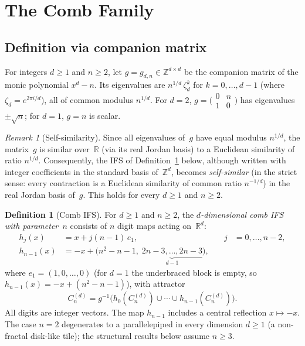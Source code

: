 \documentclass{amsart}
\theoremstyle{definition}
\newtheorem{definition}[theorem]{Definition}
\theoremstyle{remark}
\newtheorem{remark}[theorem]{Remark}
\newcommand{\R}{\mathbb{R}}
\newcommand{\Z}{\mathbb{Z}}
\begin{document}
\section{The Comb Family}
\label{sec:comb}

\subsection{Definition via companion matrix}

For integers $d \ge 1$ and $n \ge 2$, let
$g = g_{d,n} \in \Z^{d \times d}$
be the companion matrix of the monic polynomial $x^d - n$.
Its eigenvalues are
$n^{1/d}\,\zeta_d^k$ for $k = 0, \ldots, d{-}1$
(where $\zeta_d = e^{2\pi i/d}$), all of common modulus $n^{1/d}$.
For $d = 2$, $g = \bigl(\begin{smallmatrix}0 & n \\ 1 & 0\end{smallmatrix}\bigr)$
has eigenvalues $\pm\sqrt n$; for $d = 1$, $g = n$ is scalar.

\begin{remark}[Self-similarity]
\label{rem:jordan-similarity}
Since all eigenvalues of~$g$ have equal modulus $n^{1/d}$, the
matrix~$g$ is similar over~$\R$ (via its real Jordan basis) to a
Euclidean similarity of ratio $n^{1/d}$.
Consequently, the IFS of Definition~\ref{def:comb-d} below, although
written with integer coefficients in the standard basis of~$\Z^d$,
becomes \emph{self-similar} (in the strict sense: every contraction
is a Euclidean similarity of common ratio $n^{-1/d}$) in the real
Jordan basis of~$g$.
This holds for every $d \ge 1$ and $n \ge 2$.
\end{remark}

\begin{definition}[Comb IFS]\label{def:comb-d}\label{def:comb}
For $d \ge 1$ and $n \ge 2$, the \emph{$d$-dimensional comb IFS with
parameter~$n$} consists of $n$ digit maps acting on~$\R^d$:
\begin{equation}\label{eq:comb-maps}
\begin{aligned}
  h_j(x) &= x + j(n{-}1)\,e_1,
    &\quad j &= 0, \ldots, n{-}2, \\[2pt]
  h_{n-1}(x) &= -x + \bigl(n^2{-}n{-}1,\;
    \underbrace{2n{-}3, \ldots, 2n{-}3}_{d-1}\bigr),
\end{aligned}
\end{equation}
where $e_1 = (1, 0, \ldots, 0)$
(for $d = 1$ the underbraced block is empty,
so $h_{n-1}(x) = -x + (n^2{-}n{-}1)$),
with attractor
\begin{equation}\label{eq:attractor}
  C_n^{(d)} = g^{-1}\bigl(h_0(C_n^{(d)}) \cup \cdots \cup h_{n-1}(C_n^{(d)})\bigr).
\end{equation}
All digits are integer vectors.  The map $h_{n-1}$ includes a central
reflection $x \mapsto -x$.
The case $n = 2$ degenerates to a parallelepiped in every dimension
$d \ge 1$ (a non-fractal disk-like tile); the structural results below
assume $n \ge 3$.
\end{definition}
\end{document}
